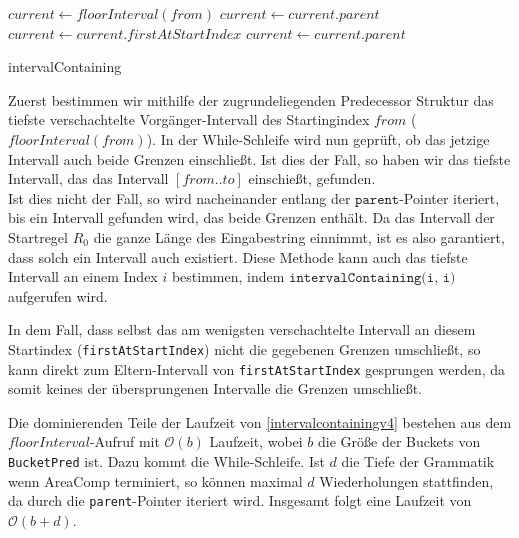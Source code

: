 \begin{algorithm}[t]
    $current \leftarrow floorInterval(from)$
     {
         {
        }
         {
            $current \leftarrow current.parent$\;
        }{
            $current \leftarrow current.firstAtStartIndex$\;
             {
                $current \leftarrow current.parent$ 
            }
        }
    }
    \KwRet{\KwNull}
    \caption{intervalContaining}
    \label{intervalcontainingv4}
\end{algorithm}

Zuerst bestimmen wir mithilfe der zugrundeliegenden Predecessor Struktur das tiefste verschachtelte Vorgänger-Intervall des Startingindex $from$ ($floorInterval(from)$). 
In der While-Schleife wird nun geprüft, ob das jetzige Intervall auch beide Grenzen einschließt. Ist dies der Fall, so haben wir das tiefste Intervall, das das Intervall $[from..to]$ einschießt, gefunden.\\
Ist dies nicht der Fall, so wird nacheinander entlang der $\texttt{parent}$-Pointer iteriert, bis ein Intervall gefunden wird, das beide Grenzen enthält. Da das Intervall der Startregel $R_0$ die ganze Länge des Eingabestring einnimmt, ist es also garantiert, dass solch ein Intervall auch existiert. Diese Methode kann auch das tiefste Intervall an einem Index $i$ bestimmen, indem $\texttt{intervalContaining(i, i)}$ aufgerufen wird.

In dem Fall, dass selbst das am wenigsten verschachtelte Intervall an diesem Startindex (\texttt{firstAtStartIndex}) nicht die gegebenen Grenzen umschließt, so kann direkt zum Eltern-Intervall von \texttt{firstAtStartIndex} gesprungen werden, da somit keines der übersprungenen Intervalle die Grenzen umschließt.

Die dominierenden Teile der Laufzeit von \autoref{intervalcontainingv4} bestehen aus dem $floorInterval$-Aufruf mit $\mathcal{O}(b)$ Laufzeit, wobei $b$ die Größe der Buckets von \texttt{BucketPred} ist. Dazu kommt die While-Schleife. Ist $d$ die Tiefe der Grammatik wenn AreaComp terminiert, so können maximal $d$ Wiederholungen stattfinden, da durch die \texttt{parent}-Pointer iteriert wird. Insgesamt folgt eine Laufzeit von $\mathcal{O}(b + d)$. 

